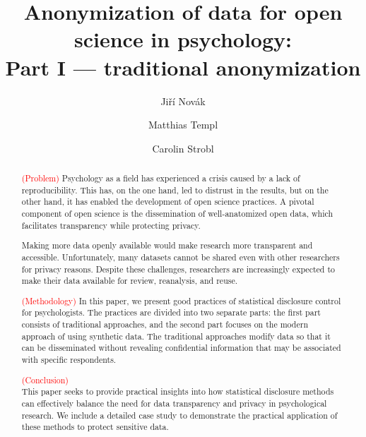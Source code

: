 \documentclass{article}
\title{Anonymization of data for open science in psychology: \\ 
       Part I — traditional anonymization
}
\author{Jiří Novák \and 
        Matthias Templ \and 
        Carolin Strobl
        }
\begin{document}
\maketitle

\begin{abstract}
\textcolor{red}{(Problem)} 
Psychology as a field has experienced a crisis caused by a lack of reproducibility. 
This has, on the one hand, led to distrust in the results, but on the other hand, it has enabled the development of open science practices. 
A pivotal component of open science is the dissemination of well-anatomized open data, which facilitates transparency while protecting privacy.

Making more data openly available would make research more transparent and accessible. Unfortunately, many datasets cannot be shared even with other researchers for privacy reasons. 
Despite these challenges, researchers are increasingly expected to make their data available for review, reanalysis, and reuse.

\textcolor{red}{(Methodology)} 
In this paper, we present good practices of statistical disclosure control for psychologists. 
The practices are divided into two separate parts: the first part consists of traditional approaches, and the second part focuses on the modern approach of using synthetic data.
The traditional approaches modify data so that it can be disseminated without revealing confidential information that may be associated with specific respondents. 

\textcolor{red}{(Conclusion)} \\ 
This paper seeks to provide practical insights into how statistical disclosure methods can effectively balance the need for data transparency and privacy in psychological research.
We include a detailed case study to demonstrate the practical application of these methods to protect sensitive data.

\end{abstract}

\end{document}
